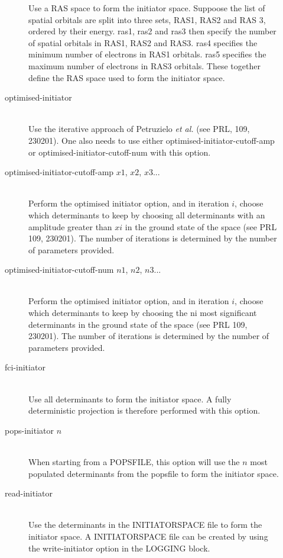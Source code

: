 \documentclass[a4paper,notitlepage]{scrreprt}
\newcommand\codeitem[1]{\needspace{1.5\baselineskip}\item[\textnormal{\ttfamily #1 \nopagebreak}] \hfill \\ \nopagebreak}
\begin{document}
\begin{description}
\begin{description}
    Use a RAS space to form the initiator space. Suppoose the list of spatial
    orbitals are split into three sets, RAS1, RAS2 and RAS 3, ordered
    by their energy. ras1, ras2 and ras3 then specify the number of
    spatial orbitals in RAS1, RAS2 and RAS3. ras4 specifies the minimum
    number of electrons in RAS1 orbitals. ras5 specifies the maximum
    number of electrons in RAS3 orbitals. These together define the RAS
    space used to form the initiator space.
    \codeitem{optimised-initiator}
    Use the iterative approach of Petruzielo \emph{et al.} (see PRL,
    109, 230201). One also needs to use either optimised-initiator-cutoff-amp
    or optimised-initiator-cutoff-num with this option.
    \codeitem{optimised-initiator-cutoff-amp $x1$, $x2$, $x3$...}
    Perform the optimised initiator option, and in iteration $i$, choose
    which determinants to keep by choosing all determinants with an
    amplitude greater than $xi$ in the ground state of the space (see
    PRL 109, 230201). The number of iterations is determined by the
    number of parameters provided.
    \codeitem{optimised-initiator-cutoff-num $n1$, $n2$, $n3$...}
    Perform the optimised initiator option, and in iteration $i$, choose
    which determinants to keep by choosing the ni most significant
    determinants in the ground state of the space (see PRL 109, 230201).
    The number of iterations is determined by the number of parameters
    provided.
    \codeitem{fci-initiator}
    Use all determinants to form the initiator space. A fully deterministic
    projection is therefore performed with this option.
    \codeitem{pops-initiator $n$}
    When starting from a POPSFILE, this option will use the $n$ most
    populated determinants from the popsfile to form the initiator space.
    \codeitem{read-initiator}
    Use the determinants in the INITIATORSPACE file to form the initiator space.
    A INITIATORSPACE file can be created by using the write-initiator option in
    the LOGGING block.
    \end{description}
  \end{description}
\end{document}
